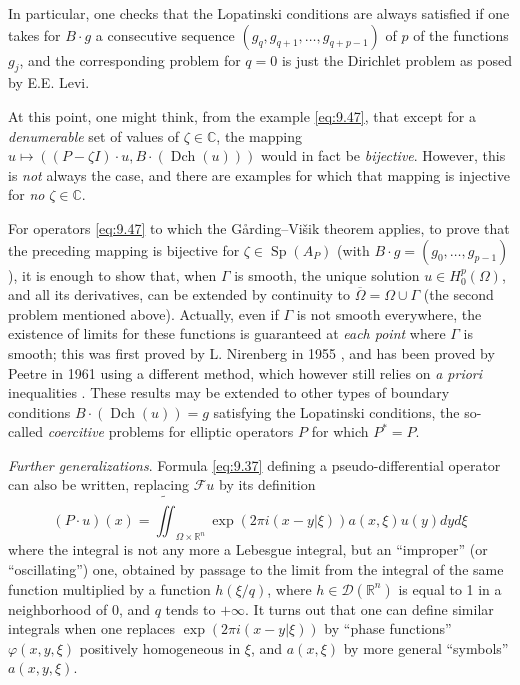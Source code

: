 \documentclass[12pt,a4paper,leqno,twoside]{extbook}
\newcommand{\C}{\mathbb{C}}
\newcommand{\R}{\mathbb{R}}
\newcommand{\Dch}{\operatorname{Dch}}
\newcommand{\spec}{\operatorname{Sp}}
\begin{document}
In particular, one checks that the Lopatinski conditions are always satisfied if one takes for \(B \cdot g\) a consecutive sequence \((g_q, g_{q+1}, \ldots, g_{q+p-1})\) of \(p\) of the functions \(g_j\), and the corresponding problem for \(q = 0\) is just the Dirichlet problem as posed by E.E. Levi.

At this point, one might think, from the example \eqref{eq:9.47}, that except for a \emph{denumerable} set of values of \(\zeta \in \C\), the mapping \(u \mapsto ((P - \zeta I) \cdot u, B\cdot (\Dch(u)))\) would in fact be \emph{bijective}. However, this is \emph{not} always the case, and there are examples for which that mapping is injective for \emph{no} \(\zeta \in \C\).

For operators \eqref{eq:9.47} to which the Gårding--Višik theorem applies, to prove that the preceding mapping is bijective for \(\zeta \in \spec(A_P)\) (with \(B \cdot g = (g_0, \ldots, g_{p-1})\)), it is enough to show that, when \(\Gamma\) is smooth, the unique solution \(u \in H^p_0(\Omega)\), and all its derivatives, can be extended by continuity to \(\overline{\Omega} = \Omega \cup \Gamma\) (the second problem mentioned above). Actually, even if \(\Gamma\) is not smooth everywhere, the existence of limits for these functions is guaranteed at \emph{each point} where \(\Gamma\) is smooth; this was first proved by L. Nirenberg in 1955 \cite{167}, and has been proved by Peetre in 1961 using a different method, which however still relies on \emph{a priori} inequalities \cite{171}. These results may be extended to other types of boundary conditions \(B \cdot (\Dch(u)) = g\) satisfying the Lopatinski conditions, the so-called \emph{coercitive} problems for elliptic operators \(P\) for which \(P^* = P\).

\noindent \emph{Further generalizations}. Formula \eqref{eq:9.37} defining a pseudo-differential operator can also be written, replacing \(\mathcal{F}u\) by its definition
\[
    (P \cdot u)(x) = \widetilde{\iint}_{\Omega \times \R^n} \exp(2\pi i(x - y | \xi)) a(x, \xi) u(y) dy d\xi
\]
where the integral is not any more a Lebesgue integral, but an ``improper'' (or ``oscillating'') one, obtained by passage to the limit from the integral of the same function multiplied by a function \(h(\xi/q)\), where \(h \in \mathcal{D}(\R^n)\) is equal to 1 in a neighborhood of 0, and \(q\) tends to \(+\infty\). It turns out that one can define similar integrals when one replaces \(\exp(2\pi i(x-y|\xi))\) by ``phase functions'' \(\varphi(x, y, \xi)\) positively homogeneous in \(\xi\), and \(a(x, \xi)\) by more general ``symbols'' \(a(x,y,\xi)\).
\end{document}
